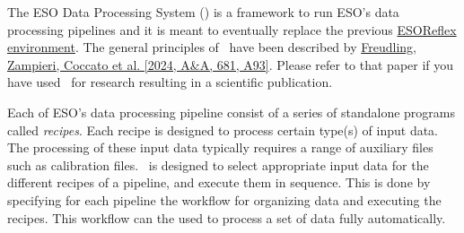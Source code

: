 The ESO Data Processing System (\edps) is a framework to run ESO’s
data processing pipelines and it is meant to eventually replace the
previous \href{https://www.eso.org/sci/software/esoreflex/}{ESOReflex
  environment}. The general principles of \edps\ have been described by
\href{https://www.aanda.org/articles/aa/full_html/2024/01/aa47651-23/aa47651-23.html}{Freudling,
  Zampieri, Coccato et al. [2024, A\&A, 681, A93]}. Please refer to
that paper if you have used \edps\ for research resulting in a
scientific publication.

Each of ESO’s data processing pipeline consist of a series of
standalone programs called {\it recipes}. Each recipe is designed to
process certain type(s) of input data. The processing of these input
data typically requires a range of auxiliary files such as calibration
files. \edps\ is designed to select appropriate input data for the
different recipes of a pipeline, and execute them in sequence. This is
done by specifying for each pipeline the workflow for organizing data
and executing the recipes. This workflow can the used to process a set
of data fully automatically.
